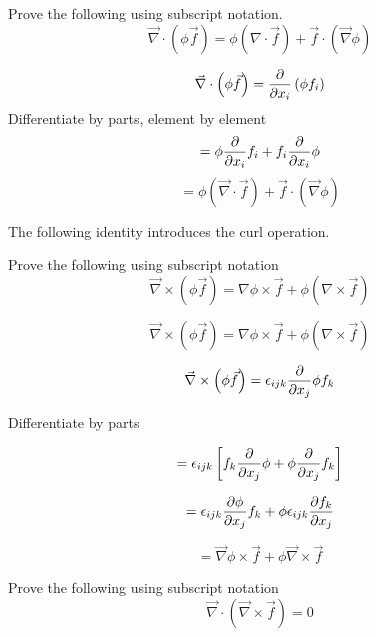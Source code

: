 
\begin{question}
	\label{divsv}
Prove the following using subscript notation.
$$\vec{\nabla} \cdot (\phi\vec{f}) = \phi (\nabla\cdot\vec{f}) + \vec{f} \cdot \left(\vec{\nabla}\phi\right) $$
\end{question}
\begin{solution}[print]
$$ \vec{\nabla} \cdot \left( \phi \vec{f} \right) = {\partial \over \partial x_i} \left( \phi f_i \right) $$
Differentiate by parts, element by element
$$ = \phi {\partial \over \partial x_i} f_i + f_i {\partial \over \partial x_i} \phi $$
$$ = \phi \left( \vec{\nabla} \cdot \vec{f} \right) + \vec{f} \cdot \left( \vec{\nabla} \phi \right) $$
\end{solution}


The following identity introduces the curl operation. 

\begin{question}
Prove the following using subscript notation
$$ \vec{\nabla} \times(\phi\vec{f}) = \nabla\phi \times \vec{f} + \phi (\nabla\times\vec{f})$$
\end{question}

\begin{solution}[print]
$$ \vec{\nabla} \times(\phi\vec{f}) = \nabla\phi \times \vec{f} + \phi (\nabla\times\vec{f})$$

$$ \vec{\nabla} \times \left( \phi \vec{f} \right) = \epsilon_{ijk} {\partial \over \partial x_j} {\phi f_k} $$

Differentiate by parts

$$ = \epsilon_{ijk} \left[ f_k {\partial \over \partial x_j} \phi + \phi {\partial \over \partial x_j} f_k \right] $$

$$ = \epsilon_{ijk} {\partial \phi \over \partial x_j} f_k + \phi \epsilon_{ijk} {\partial f_k \over \partial x_j} $$

$$ = \vec{\nabla}\phi \times \vec{f} + \phi \vec{\nabla} \times \vec{f} $$

\end{solution}


\begin{question}
Prove the following using subscript notation
$$\vec{\nabla}\cdot(\vec{\nabla}\times\vec{f}) = 0$$
\end{question} 

